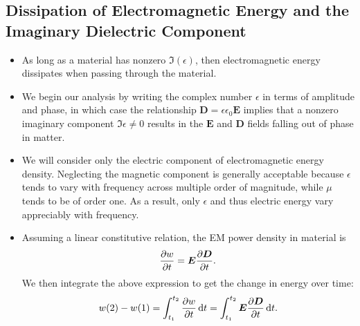 \documentclass[11pt, a4paper]{article}
\newcommand{\diff}{\mathop{}\!\mathrm{d}} %
\renewcommand{\vec}[1]{\bm{#1}} %
\newcommand{\E}{\vec{E}} %
\newcommand{\D}{\vec{D}}  %
\newcommand{\ee}{\epsilon_{0}}  %
\begin{document}
\subsection{Dissipation of Electromagnetic Energy and the Imaginary Dielectric Component}
\begin{itemize}
    \item As long as a material has nonzero $ \Im(\epsilon) $, then electromagnetic energy dissipates when passing through the material.

    \item We begin our analysis by writing the complex number $ \epsilon $ in terms of amplitude and phase, in which case the relationship $ \D = \epsilon \ee \E $ implies that a nonzero imaginary component $ \Im \epsilon \neq 0 $ results in the $ \E $ and $ \D $ fields falling out of phase in matter.

    \item We will consider only the electric component of electromagnetic energy density. Neglecting the magnetic component is generally acceptable because $ \epsilon $ tends to vary with frequency across multiple order of magnitude, while $ \mu $ tends to be of order one. As a result, only $ \epsilon $ and thus electric energy vary appreciably with frequency.

    \item Assuming a linear constitutive relation, the EM power density in material is
    \begin{equation*}
        \pdv{w}{t} = \E \pdv{\D}{t}.
    \end{equation*}
    We then integrate the above expression to get the change in energy over time:
    \begin{equation*}
        w(2) - w(1) = \int_{t_{1}}^{t_{2}} \pdv{w}{t}\diff t = \int_{t_{1}}^{t_{2}} \E \pdv{\D}{t} \diff t.
    \end{equation*}
    

\end{itemize}
\end{document}

